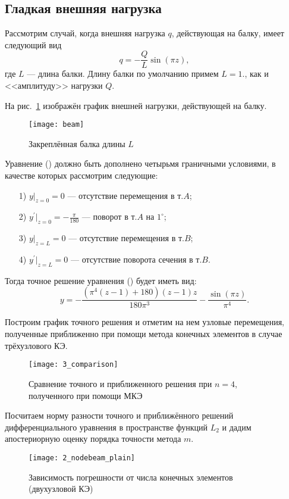 \documentclass[12pt,a4paper]{article}
\begin{document}
\subsection{Гладкая внешняя нагрузка}

Рассмотрим случай, когда внешняя нагрузка $q$, действующая на балку, имеет следующий вид 
$$q=-\frac{Q}{L} \sin(\pi z),$$
где $L$ --- длина балки. Длину балки по умолчанию примем $L=1.$, как и <<амплитуду>> нагрузки $Q$. 

	На рис.~\ref{fig:beam} изображён график внешней нагрузки, действующей на балку.
	\begin{figure}[H]
		\centering
		\texttt{[image: beam]}
		\caption{Закреплённая балка длины $L$}
		\label{fig:beam}
	\end{figure}

Уравнение () должно быть дополнено четырьмя граничными условиями, в качестве которых рассмотрим следующие:
\begin{enumerate} 
\item[1)] $y|_{z=0}=0$ --- отсутствие перемещения в т.$A$;
\item[2)] $y^{'}|_{z=0}=-\frac{\pi}{180}$ --- поворот в т.$A$ на $1^{\circ}$;
\item[3)] $y|_{z=L}=0$ --- отсутствие перемещения в т.$B$;
\item[4)] $y^{'}|_{z=L}=0$ --- отсутствие поворота сечения в т.$B$.
\end{enumerate}


Тогда точное решение уравнения () будет иметь вид: \\
$$y=-\frac{\left(\pi ^4 (z-1)+180\right) (z-1) z}{180 \pi ^3}-\frac{\sin (\pi  z)}{\pi ^4}.$$

Построим график точного решения и отметим на нем узловые перемещения, полученные приближенно при помощи метода конечных элементов в случае трёхузлового КЭ. 

	\begin{figure}[H]
		\centering
		\texttt{[image: 3\_comparison]}
		\caption{Сравнение точного и приближенного решения при $n=4$, полученного при помощи МКЭ}
		\label{fig:3_comparison}
	\end{figure}

Посчитаем норму разности точного и приближённого решений дифференциального уравнения в пространстве функций $L_{2}$ и дадим апостериорную оценку порядка точности метода $m$.

\begin{figure}[H]
		\centering
		\texttt{[image: 2\_nodebeam\_plain]}
		\caption{Зависимость погрешности от числа конечных элементов (двухузловой КЭ)}
		\label{fig:2_nodebeam_plain}
	\end{figure}
\end{document}

